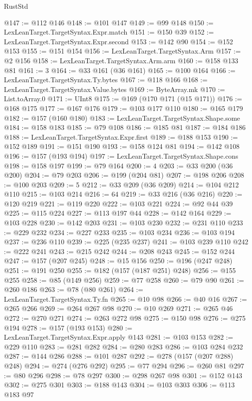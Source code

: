 \begin{lexlean}{RustStd}
\begin{coremodule}
@147 := @112 @146
@148 := @101 @147
@149 := @99 @148
@150 := LexLeanTarget.TargetSyntax.Expr.match
@151 := @150 @39
@152 := LexLeanTarget.TargetSyntax.Expr.second
@153 := @142 @90
@154 := @152 @153
@155 := @151 @154
@156 := LexLeanTarget.TargetSyntax.Arm
@157 := @2 @156
@158 := LexLeanTarget.TargetSyntax.Arm.arm
@160 := @158 @133 @81
@161 := 3
@164 := @33 @161 (@36 @161)
@165 := @100 @164
@166 := LexLeanTarget.TargetSyntax.Ty.bytes
@167 := @118 @166
@168 := LexLeanTarget.TargetSyntax.Value.bytes
@169 := ByteArray.mk
@170 := List.toArray.{0}
@171 := UInt8
@175 := @169 (@170 @171 (@15 @171))
@176 := @168 @175
@177 := @167 @176
@179 := @103 @177 @110
@180 := @165 @179
@182 := @157 (@160 @180)
@183 := LexLeanTarget.TargetSyntax.Shape.some
@184 := @158 @183
@185 := @79 @108
@186 := @185 @81
@187 := @184 @186
@188 := LexLeanTarget.TargetSyntax.Expr.first
@189 := @188 @153
@190 := @152 @189
@191 := @151 @190
@193 := @158 @124 @81
@194 := @142 @108
@196 := @157 (@193 @194)
@197 := LexLeanTarget.TargetSyntax.Shape.cons
@198 := @158 @197
@199 := @79 @164
@200 := 4
@203 := @33 @200 (@36 @200)
@204 := @79 @203
@206 := @199 (@204 @81)
@207 := @198 @206
@208 := @100 @203
@209 := 5
@212 := @33 @209 (@36 @209)
@214 := @104 @212 @110
@215 := @103 @214
@216 := 64
@219 := @33 @216 (@36 @216)
@220 := @120 @219
@221 := @119 @220
@222 := @103 @221
@224 := @92 @44 @39
@225 := @115 @224
@227 := @113 @197 @44
@228 := @142 @164
@229 := @103 @228
@230 := @142 @203
@231 := @103 @230
@232 := @231 @110
@233 := @229 @232
@234 := @227 @233
@235 := @103 @234
@236 := @103 @194
@237 := @236 @110
@239 := @225 (@235 @237)
@241 := @103 @239 @110
@242 := @222 @241
@243 := @215 @242
@244 := @208 @243
@245 := @152 @244
@247 := @157 (@207 @245)
@248 := @15 @156
@250 := @196 (@247 @248)
@251 := @191 @250
@255 := @182 (@157 (@187 @251) @248)
@256 := @155 @255
@258 := @85 (@149 @256)
@259 := @77 @258
@260 := @79 @90
@261 := @260 @186
@263 := @78 (@80 @261)
@264 := LexLeanTarget.TargetSyntax.Ty.fn
@265 := @10 @98
@266 := @40 @16
@267 := @265 @266
@269 := @264 @267 @98
@270 := @10 @269
@271 := @265 @46
@272 := @270 @271
@274 := @263 @272 @98
@275 := @150 @98
@276 := @275 @194
@278 := @157 (@193 @153)
@280 := LexLeanTarget.TargetSyntax.Expr.apply @143
@281 := @103 @153
@282 := @229 @110
@283 := @281 @282
@284 := @280 @283
@286 := @103 @284 @232
@287 := @144 @286
@288 := @101 @287
@292 := @278 (@157 (@207 @288) @248)
@294 := @274 (@276 @292)
@295 := @77 @294
@296 := @260 @81
@297 := @80 @296
@298 := @78 @297
@300 := @298 @267 @98
@301 := @152 @143
@302 := @275 @301
@303 := @188 @143
@304 := @103 @303
@306 := @113 @183 @97

\end{coremodule}
\end{lexlean}
